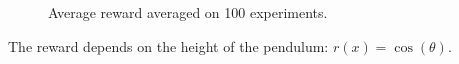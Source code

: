 \begin{figure}
\begin{minipage}{\textwidth}
\centering
{}
\hspace{-1.025cm}
\end{minipage}
\caption[Swing-up pendulum results]{Average reward averaged on 100 experiments.}\label{F:forex}
\end{figure}
The reward depends on the height of the pendulum: $r(x) = \cos(\theta)$.
